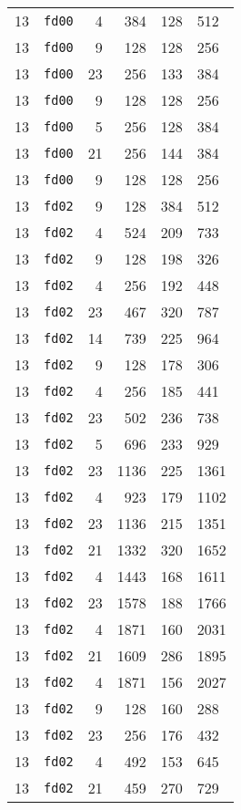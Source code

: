 \documentclass{article}
\begin{document}
\begin{table}[h!]
\begin{tabular}{llrrrl}
    13 & \texttt{fd00} & 4 & 384 & 128 & 512 \\
    13 & \texttt{fd00} & 9 & 128 & 128 & 256 \\
    13 & \texttt{fd00} & 23 & 256 & 133 & 384 \\
    13 & \texttt{fd00} & 9 & 128 & 128 & 256 \\
    13 & \texttt{fd00} & 5 & 256 & 128 & 384 \\
    13 & \texttt{fd00} & 21 & 256 & 144 & 384 \\
    13 & \texttt{fd00} & 9 & 128 & 128 & 256 \\
    13 & \texttt{fd02} & 9 & 128 & 384 & 512 \\
    13 & \texttt{fd02} & 4 & 524 & 209 & 733 \\
    13 & \texttt{fd02} & 9 & 128 & 198 & 326 \\
    13 & \texttt{fd02} & 4 & 256 & 192 & 448 \\
    13 & \texttt{fd02} & 23 & 467 & 320 & 787 \\
    13 & \texttt{fd02} & 14 & 739 & 225 & 964 \\
    13 & \texttt{fd02} & 9 & 128 & 178 & 306 \\
    13 & \texttt{fd02} & 4 & 256 & 185 & 441 \\
    13 & \texttt{fd02} & 23 & 502 & 236 & 738 \\
    13 & \texttt{fd02} & 5 & 696 & 233 & 929 \\
    13 & \texttt{fd02} & 23 & 1136 & 225 & 1361 \\
    13 & \texttt{fd02} & 4 & 923 & 179 & 1102 \\
    13 & \texttt{fd02} & 23 & 1136 & 215 & 1351 \\
    13 & \texttt{fd02} & 21 & 1332 & 320 & 1652 \\
    13 & \texttt{fd02} & 4 & 1443 & 168 & 1611 \\
    13 & \texttt{fd02} & 23 & 1578 & 188 & 1766 \\
    13 & \texttt{fd02} & 4 & 1871 & 160 & 2031 \\
    13 & \texttt{fd02} & 21 & 1609 & 286 & 1895 \\
    13 & \texttt{fd02} & 4 & 1871 & 156 & 2027 \\
    13 & \texttt{fd02} & 9 & 128 & 160 & 288 \\
    13 & \texttt{fd02} & 23 & 256 & 176 & 432 \\
    13 & \texttt{fd02} & 4 & 492 & 153 & 645 \\
    13 & \texttt{fd02} & 21 & 459 & 270 & 729 \\

\end{tabular}
\end{table}
\end{document}
